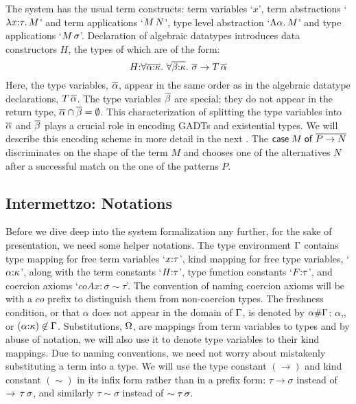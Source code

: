 \documentclass[screen,nonacm,manuscript,review]{acmart} %
\begin{document}
The system has the usual term constructs: term variables `$x$',
term abstractions `$\lambda x{:}\tau.\, M$' and term applications `$M \, N$',
type level abstraction `$\Lambda \alpha.\, M$' and type applications
`$M\,\sigma$'. Declaration of algebraic datatypes introduces data
constructors $H$, the types of which are of the form:
\[
H {:} \forall\overline{\alpha{:}\kappa}.~\forall\overline{\beta{:}\kappa}.~\overline{\sigma} \to T\,\overline{\alpha}
\]
Here, the type variables, $\overline{\alpha}$, appear in the same order as in
the algebraic datatype declarations, $T\,\overline{\alpha}$.
The type variables $\overline{\beta}$ are special; they
do not appear in the return type, $\overline{\alpha} \cap \overline{\beta} = \emptyset$. This
characterization of splitting the type variables into $\overline{\alpha}$
and $\overline{\beta}$ plays a crucial role in encoding GADTs and
existential types. We will describe this encoding scheme in more
detail in the next .
The $\mathsf{case}\;M\;\mathsf{of}\;\overline{P \to N}$
discriminates on the shape of the term $M$ and chooses one of the
alternatives $N$ after a successful match on the one of the patterns
$P$.



\subsection{Intermettzo: Notations}\label{sec:notations}
Before we dive deep into the system formalization any further, for the
sake of presentation, we need some helper notations.
The type environment $\Gamma$ contains type mapping for free term variables
`$x{:}\tau$', kind mapping for free type variables,
`$\alpha{:}\kappa$', along with the term constants `$H{:}\tau$', type
function constants `$F{:} \tau$', and coercion axioms
`$coAx:\sigma\sim\tau$'. The convention of naming
coercion axioms will be with a $co$ prefix to distinguish them from
non-coercion types. The freshness condition, or that $\alpha$ does not appear in the
domain of $\Gamma$, is denoted by $\alpha \# \Gamma$: $\alpha$,, or
$(\alpha{:}\kappa) \not\in \Gamma$. Substitutions, $\Omega$, are mappings from term variables to
types and by abuse of notation, we will also use it to denote type
variables to their kind mappings. Due to naming conventions, we need
not worry about mistakenly substituting a term into a type. We will
use the type constant $(\to)$ and kind constant $(\sim)$ in its infix
form rather than in a prefix form: $\tau \to \sigma$ instead of
$\to \,\tau\,\sigma$, and similarly $\tau\sim\sigma$ instead of
$\sim \tau\,\sigma$.
\end{document}
